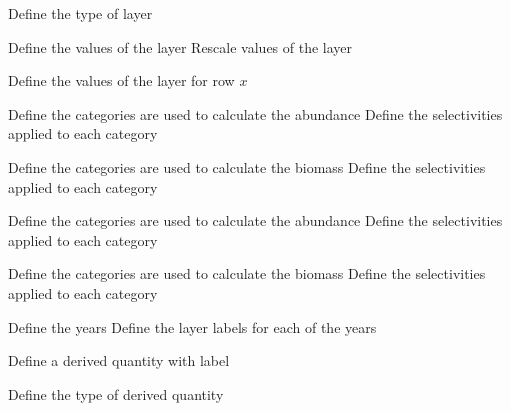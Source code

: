  {Define the type of layer}
\par\textbf{}\par
{} {Define the values of the layer}
 {Rescale values of the layer}
\par\textbf{}\par
{} {Define the values of the layer for row $x$}
\par\textbf{}\par
\par\textbf{}\par
{} {Define the categories are used to calculate the abundance}
 {Define the selectivities applied to each category}
\par\textbf{}\par
{} {Define the categories are used to calculate the biomass}
 {Define the selectivities applied to each category}
\par\textbf{}\par
{} {Define the categories are used to calculate the abundance}
 {Define the selectivities applied to each category}
\par\textbf{}\par
{} {Define the categories are used to calculate the biomass}
 {Define the selectivities applied to each category}
\par\textbf{}\par
{} {Define the years}
 {Define the layer labels for each of the years}
\par {} {Define a derived quantity with label}\par
{} {Define the type of derived quantity}
\par\textbf{}\par
